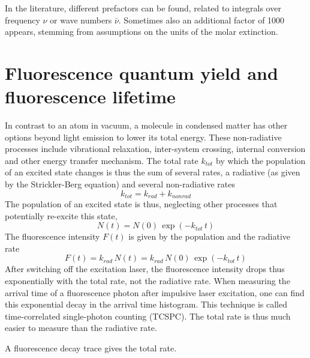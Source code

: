 In the literature, different prefactors can be found, related to integrals over frequency $\nu$ or wave numbers $\bar{\nu}$. Sometimes also an additional factor of 1000 appears, stemming from assumptions on the units of the molar extinction.














\section{Fluorescence quantum yield and fluorescence lifetime} 




In contrast to an atom in vacuum, a molecule in condensed matter has other options beyond light emission to lower its total energy. These non-radiative processes include vibrational relaxation, inter-system crossing, internal conversion and other energy transfer mechanism. The total rate $k_{tot}$ by which the population of an excited state changes is thus the sum of several rates, a radiative  (as given by the Strickler-Berg equation) and several non-radiative rates 
\begin{equation}
 k_{tot} = k_{rad} + k_{non rad} 
\end{equation}
%
The population of an excited state is thus, neglecting other processes that  potentially re-excite this state,
\begin{equation}
 N(t) = N(0) \, \exp \left( - k_{tot}  \,t \right)
\end{equation}
The fluorescence intensity $F(t)$ is given by the population and the radiative rate
\begin{equation}
 F(t) = k_{rad} \, N(t) = k_{rad} \,  N(0) \, \exp \left( - k_{tot} \, t \right)
\end{equation}
After switching off the excitation laser, the fluorescence intensity drops thus exponentially with the total rate, not the radiative rate. When measuring the arrival time of a fluorescence photon after impulsive laser excitation, one can find this exponential decay in the arrival time histogram. This technique is called time-correlated single-photon counting (TCSPC). The total rate is thus much easier to measure than the radiative rate. 


\begin{marginfigure}

  \caption{A fluorescence decay trace gives the total rate.}
\end{marginfigure}


